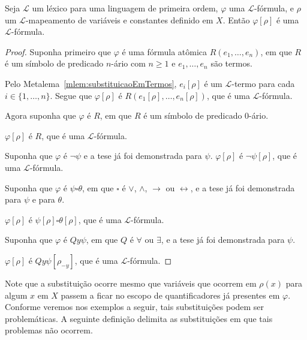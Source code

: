 \begin{metalemma}\label{mlem:substituicaoEmFormulas}
    Seja $\mathcal L$ um léxico para uma linguagem de primeira ordem, $\varphi$ uma $\mathcal L$-fórmula, e $\rho$ um $\mathcal L$-mapeamento de variáveis e constantes definido em $X$.
    Então $\varphi[\rho]$ é uma $\mathcal L$-fórmula.
\end{metalemma}
\begin{proof}

    Suponha primeiro que $\varphi$ é uma fórmula atômica $R(e_1, \dots, e_n)$, em que $R$ é um símbolo de predicado $n$-ário com $n\geq 1$ e $e_1, \dots, e_n$ são termos.

    Pelo Metalema~\ref{mlem:substituicaoEmTermos}, $e_i[\rho]$ é um $\mathcal L$-termo para cada $i\in\{1,\dots,n\}$.
    Segue que $\varphi[\rho]$ é $R(e_1[\rho], \dots, e_n[\rho])$, que é uma $\mathcal L$-fórmula.
    \smallskip

    Agora suponha que $\varphi$ é $R$, em que $R$ é um símbolo de predicado $0$-ário.
    
    $\varphi[\rho]$ é $R$, que é uma $\mathcal L$-fórmula.
    \smallskip

    Suponha que $\varphi$ é $\neg \psi$ e a tese já foi demonstrada para $\psi$.
    $\varphi[\rho]$ é $\neg \psi[\rho]$, que é uma $\mathcal L$-fórmula.
    \smallskip

    Suponha que $\varphi$ é $\psi \square \theta$, em que $\square$ é $\vee$, $\wedge$, $\rightarrow$ ou $\leftrightarrow$, e a tese já foi demonstrada para $\psi$ e para $\theta$.

    $\varphi[\rho]$ é $\psi[\rho] \square \theta[\rho]$, que é uma $\mathcal L$-fórmula.
    \smallskip

    Suponha que $\varphi$ é $Qy\psi$, em que $Q$ é $\forall$ ou $\exists$, e a tese já foi demonstrada para $\psi$.

    $\varphi[\rho]$ é $Qy\psi[\rho_{-y}]$, que é uma $\mathcal L$-fórmula.
\end{proof}

Note que a substituição ocorre mesmo que variáveis que ocorrem em $\rho(x)$ para algum $x$ em $X$ passem a ficar no escopo de quantificadores já presentes em $\varphi$.
Conforme veremos nos exemplos a seguir, tais substituições podem ser problemáticas.
A seguinte definição delimita as substituições em que tais problemas não ocorrem.

